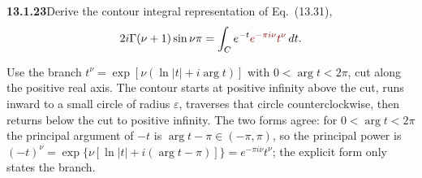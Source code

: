 \par\bigskip
\noindent\textbf{13.1.23}\quad Derive the contour integral representation of
Eq.~(13.31),
\[
2i\Gamma(\nu+1)\sin\nu\pi=\int_{C}e^{-t}\erratum{e^{-\pi i\nu}t^{\nu}}\,dt.
\]
\par\smallskip
{}
\solution
Use the branch $t^\nu=\exp[\nu(\ln|t|+i\arg t)]$ with
$0<\arg t<2\pi$, cut along the positive real axis.  The contour
starts at positive infinity above the cut, runs inward to a small
circle of radius $\varepsilon$, traverses that circle
counterclockwise, then returns below the cut to positive infinity.
  The two forms agree: for
$0<\arg t<2\pi$ the principal argument of $-t$ is
$\arg t-\pi\in(-\pi,\pi)$, so the principal power is
$(-t)^\nu=\exp\{\nu[\ln|t|+i(\arg t-\pi)]\}=e^{-\pi i\nu}t^\nu$; the
explicit form only states the branch.

